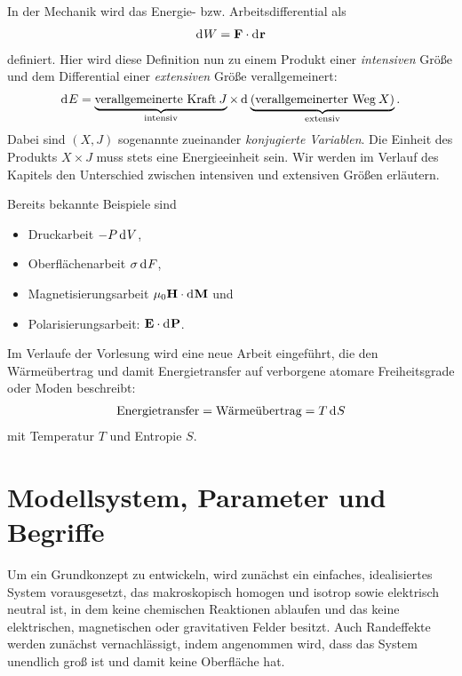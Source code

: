 In der Mechanik wird das Energie- bzw. Arbeitsdifferential als
\begin{align*}
    \mathop{\mathrm{d}^{}W} = \mathbf{F}\cdot\mathop{\mathrm{d}^{}\mathbf{r}}
\end{align*}
definiert. Hier wird diese Definition nun zu einem Produkt einer \emph{intensiven} Größe und dem Differential einer \emph{extensiven} Größe verallgemeinert:
\begin{align*}
    \mathop{\mathrm{d}^{}E} = \underbrace{\text{verallgemeinerte Kraft}\: J}_{\text{intensiv}} \times \mathop{\mathrm{d}^{}\underbrace{(\text{verallgemeinerter Weg}\: X)}_{\text{extensiv}}}.
\end{align*}
Dabei sind $(X,J)$ sogenannte zueinander \emph{konjugierte Variablen}. Die Einheit des Produkts $X\times J$ muss stets eine Energieeinheit sein. Wir werden im Verlauf des Kapitels den Unterschied zwischen intensiven und extensiven Größen erläutern. 

Bereits bekannte Beispiele sind
\begin{itemize}
    \item Druckarbeit $-P\mathop{\mathrm{d}^{}V}$,
    \item Oberflächenarbeit $\sigma\mathop{\mathrm{d}^{}F}$,
    \item Magnetisierungsarbeit $\mu_0\mathbf{H}\cdot\mathop{\mathrm{d}^{}\mathbf{M}}$ und
    \item Polarisierungsarbeit: $\mathbf{E}\cdot\mathop{\mathrm{d}^{}\mathbf{P}}$.
\end{itemize}
Im Verlaufe der Vorlesung wird eine neue Arbeit eingeführt, die den Wärmeübertrag und damit Energietransfer auf verborgene atomare Freiheitsgrade oder Moden beschreibt:
\begin{align*}
    \text{Energietransfer}=\text{Wärmeübertrag}=T\mathop{\mathrm{d}^{}S}
\end{align*}
mit Temperatur $T$ und Entropie $S$.



\section{Modellsystem, Parameter und Begriffe}

Um ein Grundkonzept zu entwickeln, wird zunächst ein einfaches, idealisiertes System vorausgesetzt, das makroskopisch homogen und isotrop sowie elektrisch neutral ist, in dem keine chemischen Reaktionen ablaufen und das keine elektrischen, magnetischen oder gravitativen Felder besitzt. Auch Randeffekte werden zunächst vernachlässigt, indem angenommen wird, dass das System unendlich groß ist und damit keine Oberfläche hat.

